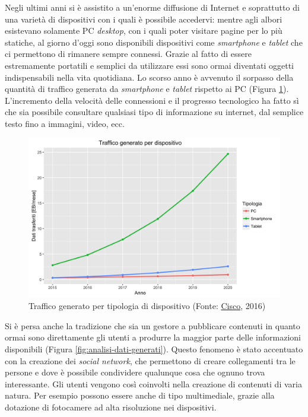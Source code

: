 Negli ultimi anni si è assistito a un'enorme diffusione di Internet e soprattutto di una varietà di dispositivi con i quali è possibile accedervi: mentre agli albori esistevano solamente PC \emph{desktop}, con i quali poter visitare pagine per lo più statiche, al giorno d'oggi sono disponibili dispositivi come \emph{smartphone} e \emph{tablet} che ci permettono di rimanere sempre connessi. Grazie al fatto di essere estremamente portatili e semplici da utilizzare essi sono ormai diventati oggetti indispensabili nella vita quotidiana. Lo scorso anno è avvenuto il sorpasso della quantità di traffico generata da \emph{smartphone} e \emph{tablet} rispetto ai PC (Figura \ref{fig:traffico-tipologia-dispositivo}). L'incremento della velocità delle connessioni e il progresso tecnologico ha fatto sì che sia possibile consultare qualsiasi tipo di informazione su internet, dal semplice testo fino a immagini, video, ecc.

\begin{figure}[ht]
	\centering
	\includegraphics[width=\textwidth]{1-introduzione/Immagini/traffico-dispositivi.png}
	\caption[Traffico generato per tipologia di dispositivo]{Traffico generato per tipologia di dispositivo (Fonte: \href{http://www.cisco.com/c/en/us/solutions/collateral/service-provider/visual-networking-index-vni/mobile-white-paper-c11-520862.html}{Cisco}, 2016)\label{fig:traffico-tipologia-dispositivo}}
\end{figure}

Si è persa anche la tradizione che sia un gestore a pubblicare contenuti in quanto ormai sono direttamente gli utenti a produrre la maggior parte delle informazioni disponibili (Figura \ref{fig:analisi-dati-generati}). Questo fenomeno è stato accentuato con la creazione dei \emph{social network}, che permettono di creare collegamenti tra le persone e dove è possibile condividere qualunque cosa che ognuno trova interessante. Gli utenti vengono così coinvolti nella creazione di contenuti di varia natura. Per esempio possono essere anche di tipo multimediale, grazie alla dotazione di fotocamere ad alta risoluzione nei dispositivi.

